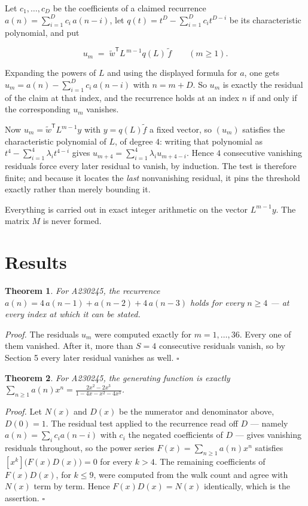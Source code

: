 \documentclass[11pt]{article}
\newtheorem{theorem}{Theorem}
\theoremstyle{definition}
\begin{document}
Let $c_1,\dots,c_D$ be the coefficients of a claimed recurrence $a(n) = \sum_{i=1}^{D} c_i\,a(n-i)$, let $q(t) = t^{D} - \sum_{i=1}^{D} c_i t^{D-i}$ be its characteristic polynomial, and put

\[u_m \;=\; \tilde w^{\mathsf T} L^{\,m-1} q(L)\,\tilde f \qquad (m \ge 1).\]

Expanding the powers of $L$ and using the displayed formula for $a$, one gets $u_m = a(n) - \sum_{i=1}^{D} c_i\,a(n-i)$ with $n = m + D$. So $u_m$ is exactly the residual of the claim at that index, and the recurrence holds at an index $n$ if and only if the corresponding $u_m$ vanishes.

Now $u_m = \tilde w^{\mathsf T} L^{m-1} y$ with $y = q(L)\tilde f$ a fixed vector, so $(u_m)$ satisfies the characteristic polynomial of $L$, of degree $4$: writing that polynomial as $t^{4} - \sum_{i=1}^{4} \lambda_i t^{4-i}$ gives $u_{m+4} = \sum_{i=1}^{4} \lambda_i u_{m+4-i}$. Hence $4$ consecutive vanishing residuals force every later residual to vanish, by induction. The test is therefore finite; and because it locates the {\itshape last} nonvanishing residual, it pins the threshold exactly rather than merely bounding it.

Everything is carried out in exact integer arithmetic on the vector $L^{m-1}y$. The matrix $M$ is never formed.

\section{Results}

\begin{theorem} For A230245, the recurrence $a(n) = 4\,a(n-1) + a(n-2) + 4\,a(n-3)$ holds for every $n \ge 4$ --- at every index at which it can be stated.\end{theorem}

{\itshape Proof.} The residuals $u_m$ were computed exactly for $m = 1,\dots,36$. Every one of them vanished. After it, more than $S = 4$ consecutive residuals vanish, so by Section 5 every later residual vanishes as well. $\square$

\begin{theorem} For A230245, the generating function is exactly $\sum_{n\ge 1} a(n)x^n = \frac{2x^{2} - 2x^{3}}{1 - 4x - x^{2} - 4x^{3}}$.\end{theorem}

{\itshape Proof.} Let $N(x)$ and $D(x)$ be the numerator and denominator above, $D(0)=1$. The residual test applied to the recurrence read off $D$ --- namely $a(n) = \sum_i c_i a(n-i)$ with $c_i$ the negated coefficients of $D$ --- gives vanishing residuals throughout, so the power series $F(x)=\sum_{n\ge 1}a(n)x^n$ satisfies $[x^k]\bigl(F(x)D(x)\bigr) = 0$ for every $k > 4$. The remaining coefficients of $F(x)D(x)$, for $k \le 9$, were computed from the walk count and agree with $N(x)$ term by term. Hence $F(x)D(x) = N(x)$ identically, which is the assertion. $\square$
\end{document}
